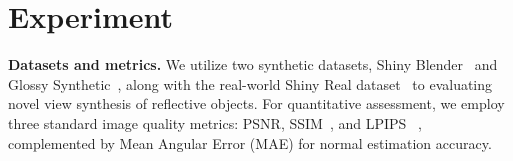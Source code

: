 \section{Experiment}
\label{sec:exp}
\noindent\textbf{Datasets and metrics.}
We utilize two synthetic datasets, Shiny Blender~\cite{verbin2022refnerf} and Glossy Synthetic~\cite{liu2023nero}, along with the real-world Shiny Real dataset~\cite{verbin2022refnerf} to evaluating novel view synthesis of reflective objects. For quantitative assessment, we employ three standard image quality metrics: PSNR, SSIM~\cite{ssim}, and LPIPS ~\cite{lpips}, complemented by Mean Angular Error (MAE) for normal estimation accuracy.

\begin{table}[]
\centering
\captionsetup{width=0.99\linewidth}
\caption{Quantitative comparison on normal maps}
\label{tab:normal_compa}
\vspace{-1em}
\end{table}

